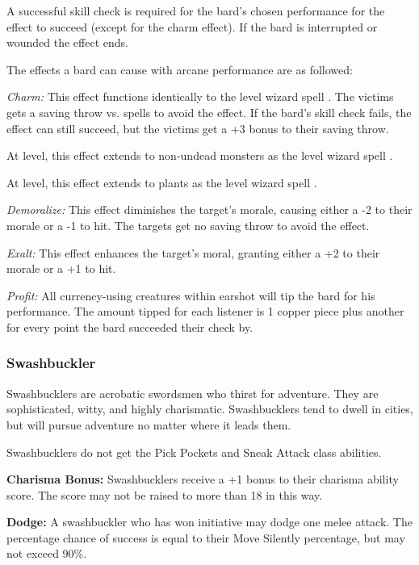 \begin{multicols*}{2}
A successful skill check is required for the bard’s chosen performance for the effect to succeed (except for the charm effect). If the bard is interrupted or wounded the effect ends.

The effects a bard can cause with arcane performance are as followed:

\textit{Charm:} This effect functions identically to the  level wizard spell . The victims gets a saving throw vs. spells to avoid the effect. If the bard’s skill check fails, the effect can still succeed, but the victims get a +3 bonus to their saving throw.

At  level, this effect extends to non-undead monsters as the  level wizard spell .

At  level, this effect extends to plants as the  level wizard spell .

\textit{Demoralize:} This effect diminishes the target’s morale, causing either a -2 to their morale or a -1 to hit. The targets get no saving throw to avoid the effect.

\textit{Exalt:} This effect enhances the target’s moral, granting either a +2 to their morale or a +1 to hit.

\textit{Profit:} All currency-using creatures within earshot will tip the bard for his performance. The amount tipped for each listener is 1 copper piece plus another for every point the bard succeeded their check by.

\subsubsection{Swashbuckler}
Swashbucklers are acrobatic swordsmen who thirst for adventure. They are sophisticated, witty, and highly charismatic. Swashbucklers tend to dwell in cities, but will pursue adventure no matter where it leads them.

Swashbucklers do not get the Pick Pockets and Sneak Attack class abilities.

\textbf{Charisma Bonus:} Swashbucklers receive a +1 bonus to their charisma ability score. The score may not be raised to more than 18 in this way.

\textbf{Dodge:} A swashbuckler who has won initiative may dodge one melee attack. The percentage chance of success is equal to their Move Silently percentage, but may not exceed 90\%.


\end{multicols*}
